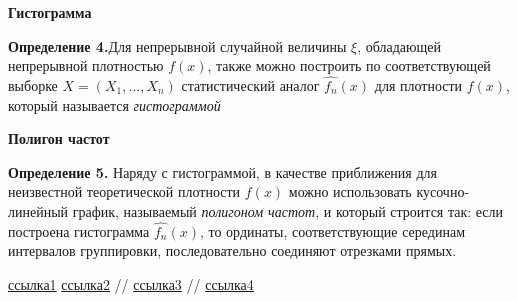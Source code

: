 \documentclass[a4paper,12pt, oneside]{book}
\begin{document}
\vspace{5mm}
\large{\textbf{Гистограмма}}
\vspace{5mm}

\normalsize{\textbf{Определение 4.}}Для непрерывной случайной величины $\xi$, обладающей непрерывной плотностью $f(x)$, также можно построить по соответствующей выборке $X = (X_1, \ldots, X_n)$ статистический аналог $\hat{f_n} (x)$ для плотности $f(x)$, который называется \textit{гистограммой}  

\vspace{5mm}
\large{\textbf{Полигон частот}}
\vspace{5mm}

\normalsize{\textbf{Определение 5.}} Наряду с гистограммой, в качестве приближения для неизвестной теоретической плотности $ f(x)$ можно использовать кусочно-линейный график, называемый \textit{полигоном частот}, и который строится так: если построена гистограмма $\hat{f_n} (x)$, то ординаты, соответствующие серединам интервалов группировки, последовательно соединяют отрезками прямых. 







\begin{thebibliography}{99}
	 \href{https://towardsdatascience.com/what-is-exponential-distribution-7bdd08590e2a}{ссылка1}
	  \href{https://www.statisticshowto.datasciencecentral.com/exponential-distribution/}{ссылка2}
	  // \href{http://www.ams.jhu.edu/~dan/550.435/notes/COURSENOTES435.pdf}{ссылка3}
	  // \href{http://www.obzh.ru/nad/4-3.html}{ссылка4}
\end{thebibliography}
\end{document}
